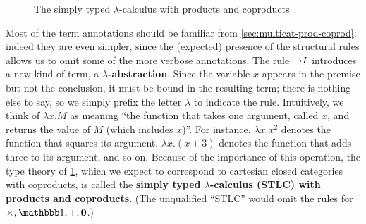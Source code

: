 \begin{figure}
  \centering
  \caption{The simply typed $\lambda$-calculus with products and coproducts}
  \label{fig:stlc}
\end{figure}

Most of the term annotations should be familiar from \cref{sec:multicat-prod-coprod}; indeed they are even simpler, since the (expected) presence of the structural rules allows us to omit some of the more verbose annotations.
The rule $\mathord{\to}I$ introduces a new kind of term, a \textbf{$\lambda$-abstraction}.
Since the variable $x$ appears in the premise but not the conclusion, it must be bound in the resulting term; there is nothing else to say, so we simply prefix the letter $\lambda$ to indicate the rule.
Intuitively, we think of $\lambda x.M$ as meaning ``the function that takes one argument, called $x$, and returns the value of $M$ (which includes $x$)''.
For instance, $\lambda x.x^2$ denotes the function that squares its argument, $\lambda x.(x+3)$ denotes the function that adds three to its argument, and so on.
Because of the importance of this operation, the type theory of \cref{fig:stlc}, which we expect to correspond to cartesian closed categories with coproducts, is called the \textbf{simply typed $\lambda$-calculus (STLC) with products and coproducts}.
(The unqualified ``STLC'' would omit the rules for $\times,\unit,+,\zero$.)

